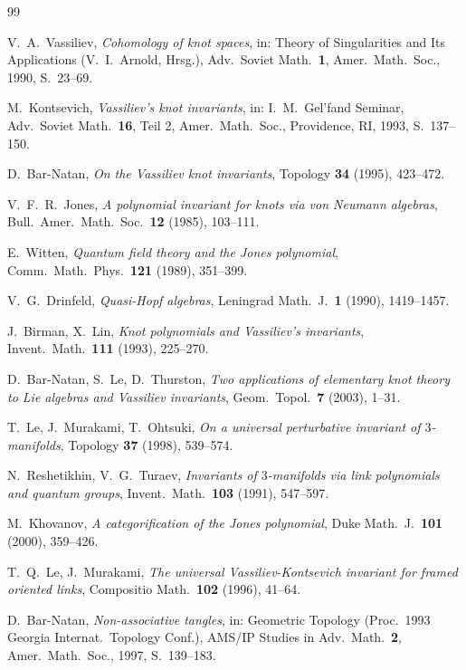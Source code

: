 \documentclass[12pt,a4paper]{amsart}
\theoremstyle{definition}
\begin{document}
\begin{thebibliography}{99}

V.\ A.\ Vassiliev,
\textit{Cohomology of knot spaces},
in: Theory of Singularities and Its Applications (V.\ I.\ Arnold, Hrsg.),
Adv.\ Soviet Math.\ \textbf{1}, Amer.\ Math.\ Soc., 1990, S.\ 23--69.

M.\ Kontsevich,
\textit{Vassiliev's knot invariants},
in: I.\ M.\ Gel'fand Seminar, Adv.\ Soviet Math.\ \textbf{16}, Teil 2,
Amer.\ Math.\ Soc., Providence, RI, 1993, S.\ 137--150.

D.\ Bar-Natan,
\textit{On the Vassiliev knot invariants},
Topology \textbf{34} (1995), 423--472.

V.\ F.\ R.\ Jones,
\textit{A polynomial invariant for knots via von Neumann algebras},
Bull.\ Amer.\ Math.\ Soc.\ \textbf{12} (1985), 103--111.

E.\ Witten,
\textit{Quantum field theory and the Jones polynomial},
Comm.\ Math.\ Phys.\ \textbf{121} (1989), 351--399.

V.\ G.\ Drinfeld,
\textit{Quasi-Hopf algebras},
Leningrad Math.\ J.\ \textbf{1} (1990), 1419--1457.

J.\ Birman, X.\ Lin,
\textit{Knot polynomials and Vassiliev's invariants},
Invent.\ Math.\ \textbf{111} (1993), 225--270.

D.\ Bar-Natan, S.\ Le, D.\ Thurston,
\textit{Two applications of elementary knot theory to Lie algebras and Vassiliev invariants},
Geom.\ Topol.\ \textbf{7} (2003), 1--31.

T.\ Le, J.\ Murakami, T.\ Ohtsuki,
\textit{On a universal perturbative invariant of $3$-manifolds},
Topology \textbf{37} (1998), 539--574.

N.\ Reshetikhin, V.\ G.\ Turaev,
\textit{Invariants of $3$-manifolds via link polynomials and quantum groups},
Invent.\ Math.\ \textbf{103} (1991), 547--597.

M.\ Khovanov,
\textit{A categorification of the Jones polynomial},
Duke Math.\ J.\ \textbf{101} (2000), 359--426.

T.\ Q.\ Le, J.\ Murakami,
\textit{The universal Vassiliev-Kontsevich invariant for framed oriented links},
Compositio Math.\ \textbf{102} (1996), 41--64.

D.\ Bar-Natan,
\textit{Non-associative tangles},
in: Geometric Topology (Proc.\ 1993 Georgia Internat.\ Topology Conf.),
AMS/IP Studies in Adv.\ Math.\ \textbf{2}, Amer.\ Math.\ Soc., 1997, S.\ 139--183.


\end{thebibliography}
\end{document}
